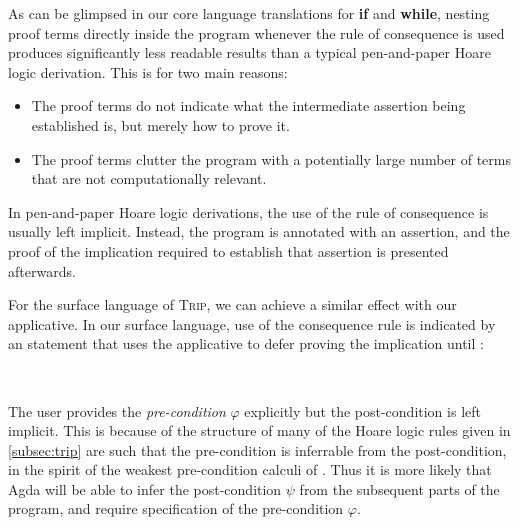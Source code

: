 \documentclass[sigplan]{acmart}%
\begin{document}
As can be glimpsed in our core language translations for \textbf{if} 
and \textbf{while}, nesting proof terms directly inside the program
whenever the rule of consequence is used produces significantly less 
readable results than a typical pen-and-paper Hoare logic 
derivation. This is for two main reasons:
\begin{itemize}
\item The proof terms do not indicate what the intermediate assertion being established is,
      but merely how to prove it.
\item The proof terms clutter the program with a potentially large number of 
      terms that are not computationally relevant.
\end{itemize}
In pen-and-paper Hoare logic derivations, the use of the rule of consequence 
is usually left implicit. Instead, the program is annotated with an assertion, 
and the proof of the implication required to establish that assertion is 
presented afterwards.

For the surface language of \textsc{Trip}, we can achieve a similar effect 
with our  applicative. In our surface language, use of 
the consequence rule is indicated by an 
statement that uses the  applicative to defer proving 
the implication until :
\begin{code}
\>[2]\AgdaSpace{}%
\AgdaSymbol{:}\AgdaSpace{}%
\AgdaSymbol{(}\AgdaSpace{}%
\AgdaSymbol{:}\AgdaSpace{}%
\AgdaSymbol{)}\AgdaSpace{}%
\AgdaSpace{}%
\AgdaSpace{}%
\AgdaOperator{\AgdaDatatype{[}}\AgdaSpace{}%
\AgdaSpace{}%
\AgdaOperator{\AgdaDatatype{,}}\AgdaSpace{}%
\AgdaSpace{}%
\AgdaOperator{\AgdaDatatype{]}}\<%
\\
%
\>[2]\AgdaSpace{}%
\AgdaSpace{}%
\AgdaSymbol{=}\AgdaSpace{}%
\AgdaSpace{}%
\AgdaSpace{}%
\AgdaSpace{}%
\<%
\end{code}
The user provides the \emph{pre-condition} $\varphi$ explicitly but the post-condition 
is left implicit. This is because of the structure of many of the Hoare logic rules given 
in \autoref{subsec:trip} are such that the pre-condition is inferrable from 
the post-condition, in the spirit of the weakest pre-condition calculi of \citet{dijkstra}. Thus it is more likely 
that Agda will be able to infer the post-condition $\psi$ from the subsequent parts of the program, and 
require specification of the pre-condition $\varphi$.
\end{document}
